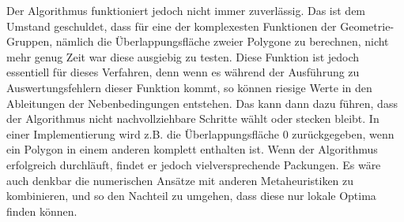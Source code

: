 \documentclass[runningheads,a4paper]{llncs}
\begin{document}
Der Algorithmus funktioniert jedoch nicht immer zuverlässig. Das ist dem Umstand geschuldet, dass für eine der komplexesten Funktionen der Geometrie-Gruppen, nämlich die Überlappungsfläche zweier Polygone zu berechnen, nicht mehr genug Zeit war diese ausgiebig zu testen. Diese Funktion ist jedoch essentiell für dieses Verfahren, denn wenn es während der Ausführung zu Auswertungsfehlern dieser Funktion kommt, so können riesige Werte in den Ableitungen der Nebenbedingungen entstehen. Das kann dann dazu führen, dass der Algorithmus nicht nachvollziehbare Schritte wählt oder stecken bleibt. In einer Implementierung wird z.B. die Überlappungsfläche $0$ zurückgegeben, wenn ein Polygon in einem anderen komplett enthalten ist. Wenn der Algorithmus erfolgreich durchläuft, findet er jedoch vielversprechende Packungen. Es wäre auch denkbar die numerischen Ansätze mit anderen Metaheuristiken zu kombinieren, und so den Nachteil zu umgehen, dass diese nur lokale Optima finden können.
\end{document}
